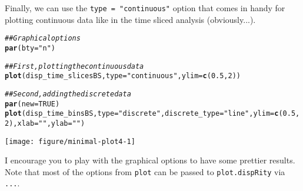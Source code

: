 \documentclass{article}\usepackage[]{graphicx}\usepackage[]{color}
\makeatletter
\newcommand{\hlnum}[1]{\textcolor[rgb]{0.686,0.059,0.569}{#1}}%
\newcommand{\hlstr}[1]{\textcolor[rgb]{0.192,0.494,0.8}{#1}}%
\newcommand{\hlcom}[1]{\textcolor[rgb]{0.678,0.584,0.686}{\textit{#1}}}%
\newcommand{\hlstd}[1]{\textcolor[rgb]{0.345,0.345,0.345}{#1}}%
\newcommand{\hlkwc}[1]{\textcolor[rgb]{0.333,0.667,0.333}{#1}}%
\newcommand{\hlkwd}[1]{\textcolor[rgb]{0.737,0.353,0.396}{\textbf{#1}}}%
\newenvironment{kframe}{%
 \def\at@end@of@kframe{}%
 \ifinner\ifhmode%
  \def\at@end@of@kframe{\end{minipage}}%
  \begin{minipage}{\columnwidth}%
 \fi\fi%
 \def\FrameCommand##1{\hskip\@totalleftmargin \hskip-\fboxsep
 \colorbox{shadecolor}{##1}\hskip-\fboxsep
     \hskip-\linewidth \hskip-\@totalleftmargin \hskip\columnwidth}%
 \MakeFramed {\advance\hsize-\width
   \@totalleftmargin\z@ \linewidth\hsize
   \@setminipage}}%
 {\par\unskip\endMakeFramed%
 \at@end@of@kframe}
\newenvironment{knitrout}{}{} %
\makeatother
\begin{document}
Finally, we can use the \texttt{type = "continuous"} option that comes in handy for plotting continuous data like in the time sliced analysis (obviously...).

\begin{knitrout}
\color{fgcolor}\begin{kframe}
\begin{alltt}
\hlcom{## Graphical options}
\hlkwd{par}\hlstd{(}\hlkwc{bty} \hlstd{=} \hlstr{"n"}\hlstd{)}

\hlcom{## First, plotting the continuous data}
\hlkwd{plot}\hlstd{(disp_time_slicesBS,} \hlkwc{type} \hlstd{=} \hlstr{"continuous"}\hlstd{,} \hlkwc{ylim}\hlstd{=}\hlkwd{c}\hlstd{(}\hlnum{0.5}\hlstd{,}\hlnum{2}\hlstd{))}

\hlcom{## Second, adding the discrete data}
\hlkwd{par}\hlstd{(}\hlkwc{new} \hlstd{=} \hlnum{TRUE}\hlstd{)}
\hlkwd{plot}\hlstd{(disp_time_binsBS,} \hlkwc{type} \hlstd{=} \hlstr{"discrete"}\hlstd{,} \hlkwc{discrete_type} \hlstd{=} \hlstr{"line"}\hlstd{,} \hlkwc{ylim}\hlstd{=}\hlkwd{c}\hlstd{(}\hlnum{0.5}\hlstd{,}\hlnum{2}\hlstd{),} \hlkwc{xlab}\hlstd{=}\hlstr{""}\hlstd{,} \hlkwc{ylab}\hlstd{=}\hlstr{""}\hlstd{)}
\end{alltt}
\end{kframe}

{\centering \texttt{[image: figure/minimal-plot4-1]} 

}



\end{knitrout}

I encourage you to play with the graphical options to have some prettier results.
Note that most of the options from \texttt{plot} can be passed to \texttt{plot.dispRity} via \texttt{...}.
\end{document}
